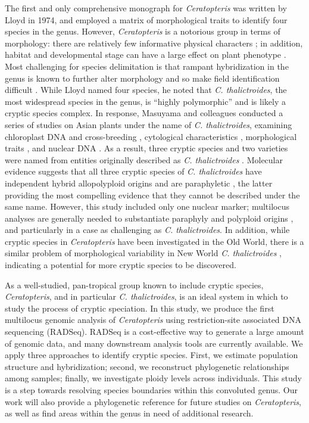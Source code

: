 \documentclass[12pt]{article}
\begin{document}
\begin{flushleft}
The first and only comprehensive monograph for \textit{Ceratopteris} was written by Lloyd in 1974, and employed a matrix of morphological traits to identify four species in the genus\nocite{LloydTax1974}. However, \textit{Ceratopteris} is a notorious group in terms of morphology: there are relatively few informative physical characters \autocite{LloydTax1974}; in addition, habitat and developmental stage can have a large effect on plant phenotype \autocite{Masuyama1992}. Most challenging for species delimitation is that rampant hybridization in the genus is known to further alter morphology and so make field identification difficult \autocite{hickok1974, LloydTax1974, Masuyama2010}. While Lloyd named four species, he noted that \textit{C. thalictroides}, the most widespread species in the genus, is ``highly polymorphic'' \autocite{LloydTax1974} and is likely a cryptic species complex. In response, Masuyama and colleagues conducted a series of studies on Asian plants under the name of \textit{C. thalictroides}, examining chloroplast DNA and cross-breeding \autocite{Masuyama2002}, cytological characteristics \autocite{Masuyama2005}, morphological traits \autocite{Masuyama1992, Masuyama2008}, and nuclear DNA \autocite{Adjie2007}. As a result, three cryptic species and two varieties were named from entities originally described as \textit{C. thalictroides} \autocite{Masuyama2010}. Molecular evidence suggests that all three cryptic species of \textit{C. thalictroides} have independent hybrid allopolyploid origins and are paraphyletic \autocite{Adjie2007}, the latter providing the most compelling evidence that they cannot be described under the same name. However, this study included only one nuclear marker; multilocus analyses are generally needed to substantiate paraphyly and polyploid origins \autocite{Eaton2013, Jorgensen2017}, and particularly in a case as challenging as \textit{C. thalictroides}. In addition, while cryptic species in \textit{Ceratopteris} have been investigated in the Old World, there is a similar problem of morphological variability in New World \textit{C. thalictroides} \autocite{Masuyama2010, LloydTax1974}, indicating a potential for more cryptic species to be discovered.

As a well-studied, pan-tropical group known to include cryptic species, \textit{Ceratopteris}, and in particular \textit{C. thalictroides}, is an ideal system in which to study the process of cryptic speciation. In this study, we produce the first multilocus genomic analysis of \textit{Ceratopteris} using restriction-site associated DNA sequencing (RADSeq). RADSeq is a cost-effective way to generate a large amount of genomic data, and many downstream analysis tools are currently available. We apply three approaches to identify cryptic species. First, we estimate population structure and hybridization; second, we reconstruct phylogenetic relationships among samples; finally, we investigate ploidy levels across individuals. This study is a step towards resolving species boundaries within this convoluted genus. Our work will also provide a phylogenetic reference for future studies on \textit{Ceratopteris}, as well as find areas within the genus in need of additional research.


\end{flushleft}
\end{document}
